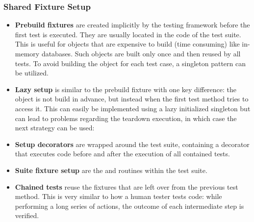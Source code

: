         \subsubsection{Shared Fixture Setup}
            \begin{itemize}
                \item \textbf{Prebuild fixtures}
                        are created implicitly by the testing framework before the first test is executed. They are usually located in the  code of the test suite.
                        This is useful for objects that are expensive to build (time consuming) like in-memory databases.
                        Such objects are built only once and then reused by all tests. To avoid building the object for each test case, a singleton pattern can be utilized.
                \item \textbf{Lazy setup}
                        is similar to the prebuild fixture with one key difference: the object is not build in advance, but instead when the first test method tries to access it.
                        This can easily be implemented using a lazy initialized singleton but can lead to problems regarding the teardown execution, in which case the next strategy can be used:
                \item \textbf{Setup decorators}
                        are wrapped around the test suite, containing a decorator that executes code before and after the execution of all contained tests.
                \item \textbf{Suite fixture setup}
                        are the  and  routines within the test suite.
                \item \textbf{Chained tests}
                        reuse the fixtures that are left over from the previous test method.
                        This is very similar to how a human tester tests code: while performing a long series of actions, the outcome of each intermediate step is verified.
            \end{itemize}

